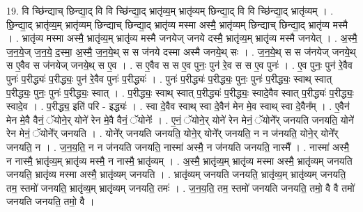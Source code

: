 \documentclass[17pt]{extarticle}
\begin{document}
19. वि च्छि॑न्द्याच् छिन्द्या॒द् वि वि च्छि॑न्द्या॒द् भ्रातृ॑व्य॒म् भ्रातृ॑व्यम् छिन्द्या॒द् वि वि च्छि॑न्द्या॒द् भ्रातृ॑व्यम् । . छि॒न्द्या॒द् भ्रातृ॑व्य॒म् भ्रातृ॑व्यम् छिन्द्याच् छिन्द्या॒द् भ्रातृ॑व्य मस्मा अस्मै॒ भ्रातृ॑व्यम् छिन्द्याच् छिन्द्या॒द् भ्रातृ॑व्य मस्मै । . भ्रातृ॑व्य मस्मा अस्मै॒ भ्रातृ॑व्य॒म् भ्रातृ॑व्य मस्मै जनयेज् जनये दस्मै॒ भ्रातृ॑व्य॒म् भ्रातृ॑व्य मस्मै जनयेत् । . अ॒स्मै॒ ज॒न॒ये॒ज् ज॒न॒ये॒ द॒स्मा॒ अ॒स्मै॒ ज॒न॒ये॒थ् स स ज॑नये दस्मा अस्मै जनये॒थ् सः । . ज॒न॒ये॒थ् स स ज॑नयेज् जनये॒थ् स ए॒वैव स ज॑नयेज् जनये॒थ् स ए॒व । . स ए॒वैव स स ए॒व पुनः॒ पुन॑ रे॒व स स ए॒व पुनः॑ । . ए॒व पुनः॒ पुन॑ रे॒वैव पुनः॑ प॒रीद्ध्यः॑ प॒रीद्ध्यः॒ पुन॑ रे॒वैव पुनः॑ प॒रीद्ध्यः॑ । . पुनः॑ प॒रीद्ध्यः॑ प॒रीद्ध्यः॒ पुनः॒ पुनः॑ प॒रीद्ध्यः॒ स्वाथ् स्वात् प॒रीद्ध्यः॒ पुनः॒ पुनः॑ प॒रीद्ध्यः॒ स्वात् । . प॒रीद्ध्यः॒ स्वाथ् स्वात् प॒रीद्ध्यः॑ प॒रीद्ध्यः॒ स्वादे॒वैव स्वात् प॒रीद्ध्यः॑ प॒रीद्ध्यः॒ स्वादे॒व । . प॒रीद्ध्य॒ इति॑ परि - इद्ध्यः॑ । . स्वा दे॒वैव स्वाथ् स्वा दे॒वैन॑ मेन मे॒व स्वाथ् स्वा दे॒वैन᳚म् । . ए॒वैन॑ मेन मे॒वै वैनं॒ ॅयोने॒र् योने॑ रेन मे॒वै वैनं॒ ॅयोनेः᳚ । . ए॒नं॒ ॅयोने॒र् योने॑ रेन मेनं॒ ॅयोने᳚र् जनयति जनयति॒ योने॑ रेन मेनं॒ ॅयोने᳚र् जनयति । . योने᳚र् जनयति जनयति॒ योने॒र् योने᳚र् जनयति॒ न न ज॑नयति॒ योने॒र् योने᳚र् जनयति॒ न । . ज॒न॒य॒ति॒ न न ज॑नयति जनयति॒ नास्मा॑ अस्मै॒ न ज॑नयति जनयति॒ नास्मै᳚ । . नास्मा॑ अस्मै॒ न नास्मै॒ भ्रातृ॑व्य॒म् भ्रातृ॑व्य मस्मै॒ न नास्मै॒ भ्रातृ॑व्यम् । . अ॒स्मै॒ भ्रातृ॑व्य॒म् भ्रातृ॑व्य मस्मा अस्मै॒ भ्रातृ॑व्यम् जनयति जनयति॒ भ्रातृ॑व्य मस्मा अस्मै॒ भ्रातृ॑व्यम् जनयति । . भ्रातृ॑व्यम् जनयति जनयति॒ भ्रातृ॑व्य॒म् भ्रातृ॑व्यम् जनयति॒ तम॒ स्तमो॑ जनयति॒ भ्रातृ॑व्य॒म् भ्रातृ॑व्यम् जनयति॒ तमः॑ । . ज॒न॒य॒ति॒ तम॒ स्तमो॑ जनयति जनयति॒ तमो॒ वै वै तमो॑ जनयति जनयति॒ तमो॒ वै । \newline
\end{document}
